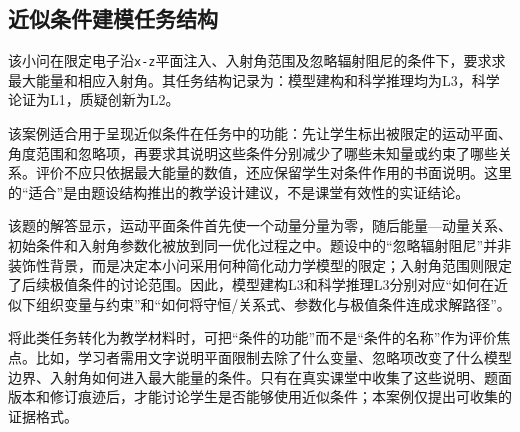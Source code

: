 \documentclass[
  12pt,
  a4paper]{ctexbook}
\begin{document}
\subsection{近似条件建模任务结构}\label{ux8fd1ux4f3cux6761ux4ef6ux5efaux6a21ux4efbux52a1ux7ed3ux6784}

该小问在限定电子沿\texttt{x-z}平面注入、入射角范围及忽略辐射阻尼的条件下，要求求最大能量和相应入射角。其任务结构记录为：模型建构和科学推理均为L3，科学论证为L1，质疑创新为L2。

该案例适合用于呈现近似条件在任务中的功能：先让学生标出被限定的运动平面、角度范围和忽略项，再要求其说明这些条件分别减少了哪些未知量或约束了哪些关系。评价不应只依据最大能量的数值，还应保留学生对条件作用的书面说明。这里的``适合''是由题设结构推出的教学设计建议，不是课堂有效性的实证结论。

该题的解答显示，运动平面条件首先使一个动量分量为零，随后能量---动量关系、初始条件和入射角参数化被放到同一优化过程之中。题设中的``忽略辐射阻尼''并非装饰性背景，而是决定本小问采用何种简化动力学模型的限定；入射角范围则限定了后续极值条件的讨论范围。因此，模型建构L3和科学推理L3分别对应``如何在近似下组织变量与约束''和``如何将守恒/关系式、参数化与极值条件连成求解路径''。

将此类任务转化为教学材料时，可把``条件的功能''而不是``条件的名称''作为评价焦点。比如，学习者需用文字说明平面限制去除了什么变量、忽略项改变了什么模型边界、入射角如何进入最大能量的条件。只有在真实课堂中收集了这些说明、题面版本和修订痕迹后，才能讨论学生是否能够使用近似条件；本案例仅提出可收集的证据格式。
\end{document}
